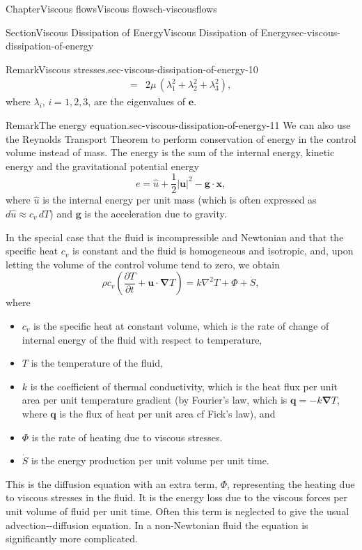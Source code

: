 \documentclass[oneside,10pt,]{book}
\newcommand{\ptxlistdisc}{\raisebox{0.3ex}{\textbullet}}
\numberwithin{equation}{section}
\newcommand{\pd}[2]{\frac{\partial#1}{\partial#2}}
\newcommand{\bx}{\boldsymbol{x}}
\newcommand{\be}{\boldsymbol{e}}
\newcommand{\bu}{\boldsymbol{u}}
\newcommand{\bg}{\boldsymbol{g}}
\newcommand{\bq}{\boldsymbol{q}}
\newcommand{\bnabla}{\boldsymbol{\nabla}}
\begin{document}
\begin{chapterptx}{Chapter}{Viscous flows}{}{Viscous flows}{}{}{ch-viscousflows}
\begin{sectionptx}{Section}{Viscous Dissipation of Energy}{}{Viscous Dissipation of Energy}{}{}{sec-viscous-dissipation-of-energy}
\begin{remark}{Remark}{Viscous stresses.}{sec-viscous-dissipation-of-energy-10}
\begin{align*}
=&2\mu\,\left(\lambda_1^2+\lambda_2^2+\lambda_3^2\right),
\end{align*}
where \(\lambda_i\), \(i=1,2,3\), are the eigenvalues of \(\be\).%
\end{remark}
\begin{remark}{Remark}{The energy equation.}{sec-viscous-dissipation-of-energy-11}%
We can also use the Reynolds Transport Theorem to perform conservation of energy in the control volume instead of mass. The energy is the sum of the internal energy, kinetic energy and the gravitational potential energy%
\begin{equation*}
e=\hat{u}+\frac12\left|{\bu}\right|^2-{\bg}\cdot{\bx},
\end{equation*}
where \(\hat{u}\) is the internal energy per unit mass (which is often expressed as \(d\hat{u}\approx c_v\,dT\)) and \({\bg}\) is the acceleration due to gravity.%
\par
In the special case that the fluid is incompressible and Newtonian and that the specific heat \(c_v\) is constant and the fluid is homogeneous and isotropic, and, upon letting the volume of the control volume tend to zero, we obtain%
\begin{equation*}
\rho c_v\left(\pd{T}{t}+{\bu}\cdot\bnabla T\right)=k\nabla^2 T+\Phi+\dot{S},
\end{equation*}
where%
\begin{itemize}[label=\ptxlistdisc]
\item{}\(c_v\) is the specific heat at constant volume, which is the rate of change of internal energy of the fluid with respect to temperature,%
\item{}\(T\) is the temperature of the fluid,%
\item{}\(k\) is the coefficient of thermal conductivity, which is the heat flux per unit area per unit temperature gradient (by Fourier's law, which is \({\bq}=-k\bnabla T\), where \({\bq}\) is the flux of heat per unit area \textendash{} cf Fick's law), and%
\item{}\(\Phi\) is the rate of heating due to viscous stresses.%
\item{}\(\dot{S}\) is the energy production per unit volume per unit time.%
\end{itemize}
This is the diffusion equation with an extra term, \(\Phi\), representing the heating due to viscous stresses in the fluid. It is the energy loss due to the viscous forces per unit volume of fluid per unit time. Often this term is neglected to give the usual advection-{}-{}diffusion equation. In a non-Newtonian fluid the equation is significantly more complicated.%

\end{remark}
\end{sectionptx}
\end{chapterptx}
\end{document}
